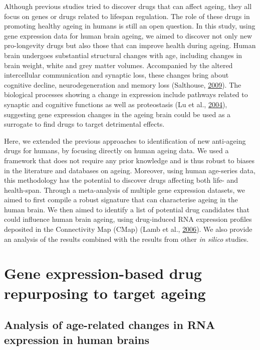 \documentclass[12pt,twoside]{unicam}
\begin{document}
Although previous studies tried to discover drugs that can affect ageing, they all focus on genes or drugs related to lifespan regulation. The role of these drugs in promoting healthy ageing in humans is still an open question. In this study, using gene expression data for human brain ageing, we aimed to discover not only new pro-longevity drugs but also those that can improve health during ageing. Human brain undergoes substantial structural changes with age, including changes in brain weight, white and grey matter volumes. Accompanied by the altered intercellular communication and synaptic loss, these changes bring about cognitive decline, neurodegeneration and memory loss (Salthouse, \protect\hyperlink{ref-Salthouse2009}{2009}). The biological processes showing a change in expression include pathways related to synaptic and cognitive functions as well as proteostasis (Lu et al., \protect\hyperlink{ref-Lu2004}{2004}), suggesting gene expression changes in the ageing brain could be used as a surrogate to find drugs to target detrimental effects.

Here, we extended the previous approaches to identification of new anti-ageing drugs for humans, by focusing directly on human ageing data. We used a framework that does not require any prior knowledge and is thus robust to biases in the literature and databases on ageing. Moreover, using human age-series data, this methodology has the potential to discover drugs affecting both life- and health-span. Through a meta-analysis of multiple gene expression datasets, we aimed to first compile a robust signature that can characterise ageing in the human brain. We then aimed to identify a list of potential drug candidates that could influence human brain ageing, using drug-induced RNA expression profiles deposited in the Connectivity Map (CMap) (Lamb et al., \protect\hyperlink{ref-Lamb2006}{2006}). We also provide an analysis of the results combined with the results from other \emph{in silico} studies.

\hypertarget{drugstudy}{%
\section{Gene expression-based drug repurposing to target ageing}\label{drugstudy}}

\hypertarget{ArrayChangesAgeing}{%
\subsection{Analysis of age-related changes in RNA expression in human brains}\label{ArrayChangesAgeing}}
\end{document}
